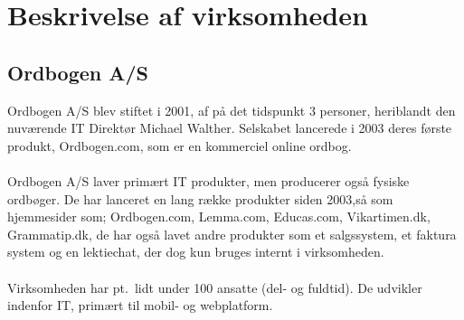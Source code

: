 \section{Beskrivelse af virksomheden}
\subsection{Ordbogen A/S}
Ordbogen A/S blev stiftet i 2001, af på det tidspunkt 3 personer, heriblandt den nuværende IT Direktør Michael Walther. Selskabet lancerede i 2003 deres første produkt, Ordbogen.com, som er en kommerciel online ordbog.
\\\\
Ordbogen A/S laver primært IT produkter, men producerer også fysiske ordbøger. De har lanceret en lang række produkter siden 2003,så som hjemmesider som; Ordbogen.com, Lemma.com, Educas.com, Vikartimen.dk, Grammatip.dk,
de har også lavet andre produkter som et salgssystem, et faktura system og en lektiechat, der dog kun bruges internt i virksomheden.
\\\\
Virksomheden har pt.\ lidt under 100 ansatte (del- og fuldtid). De udvikler indenfor IT, primært til mobil- og webplatform.
